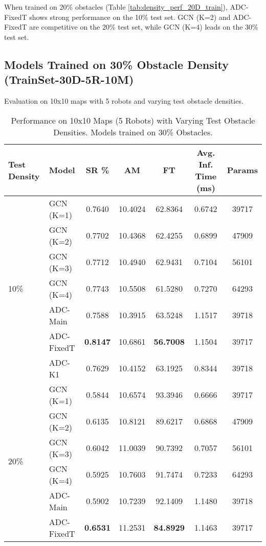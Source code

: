 When trained on 20\% obstacles (Table \ref{tab:density_perf_20D_train}), ADC-FixedT shows strong performance on the 10\% test set. GCN (K=2) and ADC-FixedT are competitive on the 20\% test set, while GCN (K=4) leads on the 30\% test set.
\newpage

\subsection{Models Trained on 30\% Obstacle Density (TrainSet-30D-5R-10M)}
\label{subsec:perf_30D_train_detailed}
Evaluation on 10x10 maps with 5 robots and varying test obstacle densities.

\begin{table}[htbp]
    \centering
    \caption{Performance on 10x10 Maps (5 Robots) with Varying Test Obstacle Densities. Models trained on 30\% Obstacles.}
    \label{tab:density_perf_30D_train}
    \scriptsize %
    \begin{tabular}{llccccc}
        \toprule
        Test Density & Model & SR \% & AM & FT & Avg. Inf. Time (ms) & Params \\
        \midrule
        \multirow{7}{*}{10\%}
        & GCN (K=1) & 0.7640 & 10.4024 & 62.8364 & 0.6742 & 39717 \\
        & GCN (K=2) & 0.7702 & 10.4368 & 62.4255 & 0.6899 & 47909 \\
        & GCN (K=3) & 0.7712 & 10.4940 & 62.9431 & 0.7104 & 56101 \\
        & GCN (K=4) & 0.7743 & 10.5508 & 61.5280 & 0.7270 & 64293 \\
        & ADC-Main & 0.7588 & 10.3915 & 63.5248 & 1.1517 & 39718 \\
        & ADC-FixedT & \textbf{0.8147} & 10.6861 & \textbf{56.7008} & 1.1504 & 39717 \\
        & ADC-K1 & 0.7629 & 10.4152 & 63.1925 & 0.8344 & 39718 \\
        \midrule
        \multirow{7}{*}{20\%}
        & GCN (K=1) & 0.5844 & 10.6574 & 93.3946 & 0.6666 & 39717 \\
        & GCN (K=2) & 0.6135 & 10.8121 & 89.6217 & 0.6868 & 47909 \\
        & GCN (K=3) & 0.6042 & 11.0039 & 90.7392 & 0.7057 & 56101 \\
        & GCN (K=4) & 0.5925 & 10.7603 & 91.7474 & 0.7233 & 64293 \\
        & ADC-Main & 0.5902 & 10.7239 & 92.1409 & 1.1480 & 39718 \\
        & ADC-FixedT & \textbf{0.6531} & 11.2531 & \textbf{84.8929} & 1.1463 & 39717 \\ %

\end{tabular}
\end{table}
